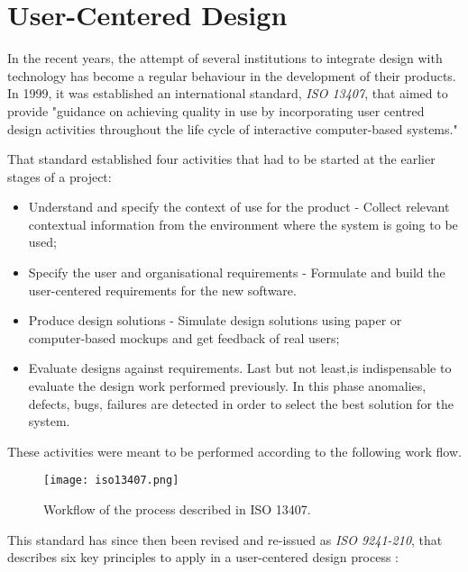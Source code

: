 \pagebreak

\section{User-Centered Design}

In the recent years, the attempt of several institutions to integrate design with technology has become a regular behaviour in the development of their products.
In 1999, it was established an international standard, \emph{ISO 13407}, that aimed to provide "guidance on achieving quality in use by incorporating user centred design activities throughout the life cycle of interactive computer-based systems."

That standard established four activities that had to be started at the earlier stages of a project:

\begin{itemize}
\item Understand and specify the context of use for the product - Collect relevant contextual information from the environment where the system is going to be used;
\item Specify the user and organisational requirements - Formulate and build the user-centered
requirements for the new software.
\item Produce design solutions - Simulate design solutions using paper or computer-based mockups and get feedback of real users;
\item Evaluate designs against requirements. Last but not least,is indispensable to evaluate
the design work performed previously. In this phase anomalies, defects, bugs, failures are detected in order to select the best solution for the system.
\end{itemize}

These activities were meant to be performed according to the following work flow.

\begin{figure}[h!]
  \begin{center}
    \leavevmode
    \texttt{[image: iso13407.png]}
    \caption{Workflow of the process described in ISO 13407.}
    \label{fig:iso}
  \end{center}
\end{figure}

This standard has since then been revised and re-issued as \emph{ISO 9241-210}, that describes six key principles to apply in a user-centered design process \cite{kn:Tra11}:

